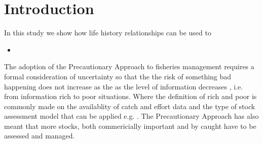 \documentclass[preprint,authoryear,12pt]{elsarticle}
\begin{document}
\begin{frontmatter}



\title{}


\author{}

\address{}

\begin{abstract}


\end{abstract}

\begin{keyword}


\end{keyword}

\end{frontmatter}


\section{Introduction}
\label{Introduction}

In this study we show how life history relationships can be used to 

\begin{itemize}
 \item 
\end{itemize}

The adoption of the Precautionary Approach to fisheries management \citep{garcia1996precautionary}
requires a formal consideration of uncertainty so that the the risk of something bad happening 
\citep{kirkwood1995assessing} does not increase as the as the level of information decreases 
\citep{cooke1999improvement}, i.e. from information rich to poor situations. Where the definition of rich 
and poor is commonly made on the availablity of catch and effort data and the type of stock assessment 
model that can be applied e.g. \citep{smith2008experience}. The Precautionary Approach has also meant
that more stocks, both commericially important and by caught have to be assessed and managed.
\end{document}
